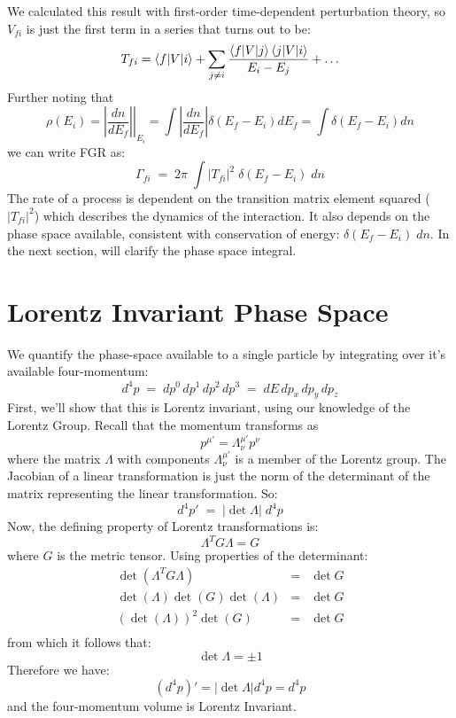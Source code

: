 \documentclass[12pt]{article}
\begin{document}
We calculated this result with first-order time-dependent perturbation
theory, so $V_{fi}$ is just the first term in a series that turns out
to be:
\begin{equation}
\label{eqn:tfi-expansion}
T_{fi} = \braket{f|V|i} + \sum_{j \neq i} \frac{\braket{f|V|j}\braket{j|V|i}}{E_i-E_j} + \ldots
\end{equation}
Further noting that
$$\rho(E_i) = \left. \left| \frac{dn}{dE_f} \right| \right|_{E_i} = \int \left| \frac{dn}{dE_f} \right| \delta(E_f-E_i) dE_f
= \int \delta(E_f-E_i) dn$$
we can write FGR as:
\begin{equation}
\label{eqn:nrfgr}
\Gamma_{fi} \; = \; 2 \pi \; \int |T_{fi}|^2 \; \delta(E_f - E_i) \; dn
\end{equation}
The rate of a process is dependent on the transition matrix element squared
($|T_{fi}|^2$) which describes the dynamics of the interaction.  It
also depends on the phase space available, consistent with
conservation of energy: $\delta(E_f - E_i) \; dn$.  In the next
section, will clarify the phase space integral.


\section{Lorentz Invariant Phase Space}

We quantify the phase-space available to a single particle by
integrating over it's available four-momentum:
$$ d^4p \; = \; dp^0 \, dp^1 \, dp^2 \, dp^3 \; = \; dE \, dp_x \, dp_y \, dp_z $$
First, we'll show that this is Lorentz invariant, using our knowledge
of the Lorentz Group.  Recall that the momentum transforms as
$$p^{\mu'} = \Lambda^{\mu'}_\nu p^\nu$$
where the matrix $\Lambda$ with components $\Lambda^{\mu'}_\nu$ is a
member of the Lorentz group.  The Jacobian of a linear
transformation is just the norm of the determinant of the matrix
representing the linear transformation.  So:
$$d^4p' \; = \; |\det \Lambda| \; d^4p$$
Now, the defining property of Lorentz transformations is:
$$\Lambda^T G \Lambda = G$$
where $G$ is the metric tensor.  Using properties of the determinant:
\begin{eqnarray*}
  \det \left( \Lambda^T G \Lambda \right) &=& \det G \\
  \det (\Lambda) \det (G) \det(\Lambda) &=& \det G \\
    \left( \det (\Lambda) \right)^2 \det (G) &=& \det G \\
\end{eqnarray*}
from which it follows that:
$$\det \Lambda = \pm 1$$
Therefore we have:
$$(d^4 p)' = \left| \det \Lambda \right| d^4 p = d^4 p$$
and the four-momentum volume is Lorentz Invariant.
\end{document}
